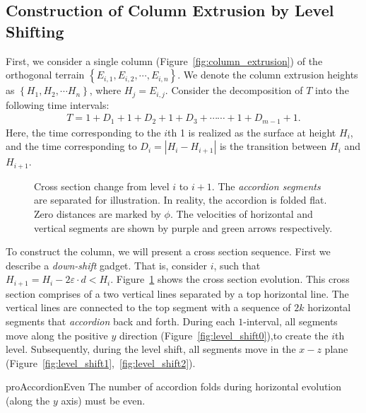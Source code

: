 \subsection{Construction of Column Extrusion by Level Shifting}
\label{sec:column_extrusion}

First, we consider a single column (Figure~\ref{fig:column_extrusion})
of the orthogonal terrain $\left\{ E_{i,1}, E_{i,2}, \cdots, E_{i,n} \right\}$.
We denote the column extrusion heights as $\left\{ H_1, H_2,\cdots H_n \right\}$, where $H_j = E_{i,j}$.
Consider the decomposition of $T$ into the following time intervals:%
\begin{align}
    \label{eq:column_decomposition}
T = 1 + D_1  +  1 + D_2  +  1 + D_3  +\cdots\cdots +  1 + D_{m-1}  +  1.
\end{align}
Here, the time corresponding to the $i$th 1 is realized as the surface at height $H_i$,
and the time corresponding to $D_i = \left| H_i-H_{i+1}\right|$ is the transition between $H_i$ and $H_{i+1}$.

\graphicspath{{./figures/}}
\begin{figure}[htb]
    \def\svgwidth{1.0\textwidth}
    \caption{
    Cross section change from level $i$ to $i+1$. The \emph{accordion segments} are separated for illustration.
    In reality, the accordion is folded flat. Zero distances are marked by $\phi$.
    The velocities of horizontal and vertical segments are shown by purple and green arrows respectively.
    }
    \label{fig:level_shift_layers}
\end{figure}

%

To construct the column, we will present a cross section sequence. First we describe a \emph{down-shift} gadget.
That is, consider $i$, such that $H_{i+1} = H_i-2\varepsilon\cdot d < H_i$.
Figure~\ref{fig:level_shift_layers} shows the cross section evolution.
This cross section comprises of a two vertical lines separated by a top horizontal line.
The vertical lines are connected to the top segment with
a sequence of $2k$ horizontal segments that \emph{accordion} back and forth.
During each $1$-interval, all segments move along the positive $y$ direction (Figure~\ref{fig:level_shift0}),to create the $i$th level.
Subsequently, during the level shift, all segments move in the $x-z$ plane (Figure~\ref{fig:level_shift1},~\ref{fig:level_shift2}).
\begin{restatable}{pro}{AccordionEven}
\label{pro:accordion_even}
The number of accordion folds during horizontal evolution (along the $y$ axis) must be even.
\end{restatable}

